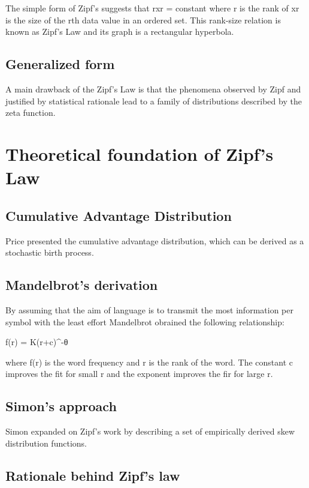 \documentclass{article}
\begin{document}
The simple form of Zipf's suggests that rxr = constant where r is the
 rank of xr is the size of the rth data value in an ordered set. This
 rank-size relation is known as Zipf's Law and its graph is a
 rectangular hyperbola.

\subsection{Generalized form}

A main drawback of the Zipf's Law is that the phenomena observed by
Zipf and justified by statistical rationale lead to a family of
distributions described by the zeta function.

\section{Theoretical foundation of Zipf's Law}
\subsection{Cumulative Advantage Distribution}

Price presented the cumulative advantage distribution, which can be
derived as a stochastic birth process.

\subsection{Mandelbrot's derivation}

By assuming that the aim of language is to transmit the most
information per symbol with the least effort Mandelbrot obrained the
following relationship:

f(r) = K(r+c)^-θ

where f(r) is the word frequency and r is the rank of the word. The
constant c improves the fit for small r and the exponent improves the
fir for large r.

\subsection{Simon's approach}

Simon expanded on Zipf's work by describing a set of empirically
derived skew distribution functions.

\subsection{Rationale behind Zipf's law}
\end{document}
